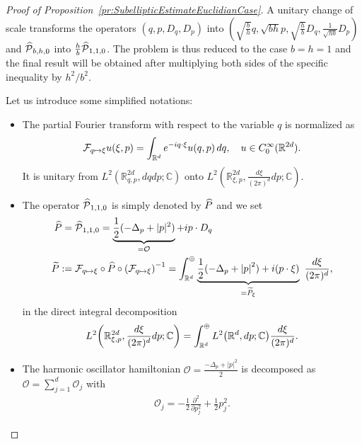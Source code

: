 \documentclass[10pt]{amsart}
\theoremstyle{definition}\newtheorem{defi}[theo]{Definition}\newtheorem{rema}[theo]{Remark}\newtheorem{exam}[theo]{Example}\newtheorem{exem}[theo]{Example}\newtheorem{nota}[theo]{Notation}
\newcommand{\C}{\mathbb{C}}
\newcommand{\R}{\mathbb{R}}
\newcommand{\clO}{\mathcal{O}}
\newcommand{\clP}{\mathcal{P}}
\newcommand{\clF}{\mathcal{F}}
\newcommand{\p}{\partial}
\newcommand{\abs}[1]{\left| #1 \right|}
\newcommand*{\Mk}{\mkern -2mu}
\newcommand*{\MK}{\mkern 2mu}
\let\oldhat\hat
\renewcommand*{\hat}[1]{\mathchoice{\widehat{#1}}{\widehat{#1}}{\oldhat{#1}}{\oldhat{#1}}}
\let\originalleft\left
\let\originalright\right
\renewcommand{\left}{\mathopen{}\mathclose\bgroup\originalleft}
\renewcommand{\right}{\aftergroup\egroup\originalright}
\let\oldmapsto\mapsto
\renewcommand*{\mapsto}{\mathchoice{\longmapsto}{\oldmapsto}{\oldmapsto}{\oldmapsto}}
\begin{document}
\begin{proof}[{Proof of Proposition~\ref{pr:SubellipticEstimateEuclidianCase}}]
A unitary change of scale transforms the operators $(q,p,D_q,D_p)$ into $ (\sqrt{\frac{b}{h}}q, \sqrt{bh}p, \sqrt{\frac{h}{b}} D_q, \frac{1}{\sqrt{hb}}D_p)$ and $\hat{\clP}_{b,h,0}$ into $\frac{h}{b}\hat{\clP}_{1,1,0}$. The problem is thus reduced to the case $b=h=1$ and the final result will be obtained after multiplying both sides of the specific inequality by $h^2/b^2$.

Let us introduce some simplified notations:
\begin{itemize}
\item The partial Fourier transform with respect to the variable $q$ is normalized as
\begin{equation}
\clF_{q \mapsto \xi} u(\xi, p) = \int_{\R^d} e^{-i q \cdot \xi} u(q,p) \, dq, \quad u \in C^\infty_0(\R^{2d}).
\end{equation}
It is unitary from $L^2(\R^{2d}_{q,p},dqdp;\C)$ onto $L^2(\R^{2d}_{\xi,p},\frac{d\xi}{(2\pi)^{d}}dp; \C)$.
\item The operator $\hat{\clP}_{1,1,0}$ is simply denoted by $\hat{P}$ and we set
\begin{equation}\label{conjugation_partial_FT}
\begin{aligned}
\hat{P}&=\hat{\clP}_{1,1,0}=\underbrace{\frac{1}{2}(-\Delta_{p} + |p|^{2})}_{=\clO} + i p\cdot D_q\\
\widetilde{P} \,\MK &\!\Mk:= \clF_{q \mapsto \xi} \circ \hat{P} \circ \left(\clF_{q \mapsto \xi}\right)^{-1} = \int_{\R^d}^{\oplus}\underbrace{\frac{1}{2}(-\Delta_p + \abs{p}^2)+i (p\cdot\xi)}_{=\widetilde{P}_{\xi}}~\frac{d\xi}{(2\pi)^d},
\end{aligned}
\end{equation}
in the direct integral decomposition
\[
L^2\left(\R^{2d}_{\xi,p},\frac{d\xi}{(2\pi)^d}dp;\C\right)=\int_{\R^d}^{\oplus}L^2\left(\R^d,dp;\C\right) \frac{d\xi}{(2\pi)^d}.
\]
\item The harmonic oscillator hamiltonian $\clO=\frac{-\Delta_p+|p|^2}{2}$ is decomposed as $\clO=\sum_{j=1}^{d}\clO_j$ with
\begin{align*}
\clO_j = -\frac{1}{2} \frac{\p^2}{\p p_j^2} + \frac{1}{2} p_j^2.
\end{align*}


\end{itemize}
\end{proof}
\end{document}
